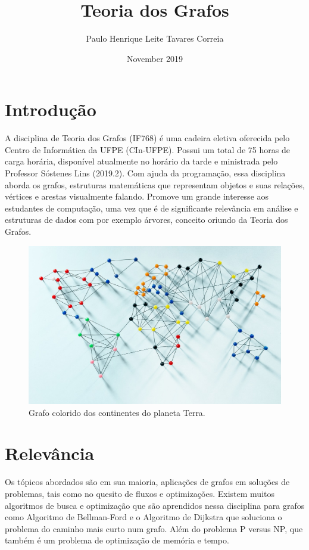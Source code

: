 \documentclass[a4paper,10pt]{article}
\title{Teoria dos Grafos}
\author{Paulo Henrique Leite Tavares Correia }
\date{November 2019}
\begin{document}
\maketitle

\section{Introdução}
A disciplina de Teoria dos Grafos (IF768) é uma cadeira eletiva oferecida pelo Centro de Informática da UFPE (CIn-UFPE). Possui um total de 75 horas de carga horária, disponível atualmente no horário da tarde e ministrada pelo Professor Sóstenes Lins\cite{wiki:xxx} (2019.2). Com ajuda da programação, essa disciplina aborda os grafos, estruturas matemáticas que representam objetos e suas relações, vértices e arestas visualmente falando. Promove um grande interesse aos estudantes de computação, uma vez que é de significante relevância em análise e estruturas de dados com por exemplo árvores, conceito oriundo da Teoria dos Grafos.
\begin{figure}[h!]
\centering
\includegraphics[scale=1]{Graph-Theory.jpg}
\caption{Grafo colorido dos continentes do planeta Terra. \cite{img:graph}}
\label{fig:graph1}
\end{figure}

\section{Relevância}
Os tópicos abordados são em sua maioria, aplicações de grafos em soluções de problemas, tais como no quesito de fluxos e optimizações. Existem muitos algoritmos de busca e optimização que são aprendidos nessa disciplina para grafos como Algoritmo de Bellman-Ford\cite{wiki:xxb} e o Algoritmo de Dijkstra\cite{wiki:xxa} que soluciona o problema do caminho mais curto num grafo. Além do problema P versus NP, que também é um problema de optimização de memória e tempo.
\end{document}
